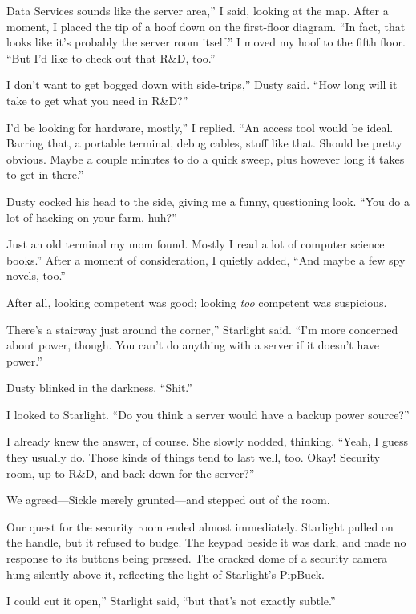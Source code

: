 \leavevmode{}Data Services sounds like the server area,” I said, looking at the map. After a moment, I placed the tip of a hoof down on the first-floor diagram. “In fact, that looks like it’s probably the server room itself.” I moved my hoof to the fifth floor. “But I’d like to check out that R\&D, too.”

\leavevmode{}I don’t want to get bogged down with side-trips,” Dusty said. “How long will it take to get what you need in R\&D?”

\leavevmode{}I’d be looking for hardware, mostly,” I replied. “An access tool would be ideal. Barring that, a portable terminal, debug cables, stuff like that. Should be pretty obvious. Maybe a couple minutes to do a quick sweep, plus however long it takes to get in there.”

Dusty cocked his head to the side, giving me a funny, questioning look. “You do a lot of hacking on your farm, huh?”

\leavevmode{}Just an old terminal my mom found. Mostly I read a lot of computer science books.” After a moment of consideration, I quietly added, “And maybe a few spy novels, too.”

After all, looking competent was good; looking \textit{too} competent was suspicious.

\leavevmode{}There’s a stairway just around the corner,” Starlight said. “I’m more concerned about power, though. You can’t do anything with a server if it doesn’t have power.”

Dusty blinked in the darkness. “Shit.”

I looked to Starlight. “Do you think a server would have a backup power source?”

I already knew the answer, of course. She slowly nodded, thinking. “Yeah, I guess they usually do. Those kinds of things tend to last well, too. Okay! Security room, up to R\&D, and back down for the server?”

We agreed—Sickle merely grunted—and stepped out of the room.

Our quest for the security room ended almost immediately. Starlight pulled on the handle, but it refused to budge. The keypad beside it was dark, and made no response to its buttons being pressed. The cracked dome of a security camera hung silently above it, reflecting the light of Starlight’s PipBuck.

\leavevmode{}I could cut it open,” Starlight said, “but that’s not exactly subtle.”

